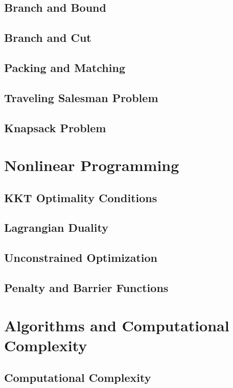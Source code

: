 \documentclass[10pt]{book}
\begin{document}
		\chapter{Branch and Bound}

		\chapter{Branch and Cut}

		\chapter{Packing and Matching}

		\chapter{Traveling Salesman Problem}

		\chapter{Knapsack Problem}

	\part{Nonlinear Programming}
		\chapter{KKT Optimality Conditions}

		\chapter{Lagrangian Duality}

		\chapter{Unconstrained Optimization}

		\chapter{Penalty and Barrier Functions}

	\part{Algorithms and Computational Complexity}
		\chapter{Computational Complexity}
\end{document}
